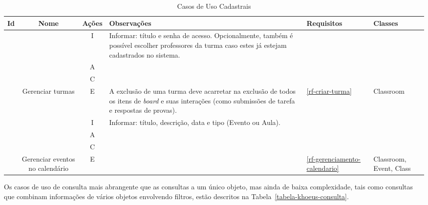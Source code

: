 \begin{table}[H]
	\centering  \vspace{0.5cm} 	\footnotesize 
	\caption{Casos de Uso Cadastrais}
	\begin{tabular}{|c|c|c|p{6cm}|p{1.5cm}|p{2cm}|} \hline  \rowcolor[rgb]{0.8,0.8,0.8}
		
		Id & Nome  &  Ações  &  Observações & Requisitos   & Classes  \\ 	\hline \hline	
		
		{}  &  {}  &  I   & Informar: título e senha de acesso. Opcionalmente, também é possível escolher professores da turma caso estes já estejam cadastrados no sistema. &   {}   & {}    \\\cline{3-4}
		{}  &  {}  &  A   &  {}   &   {}   &  {}  \\ \cline{3-4}
		{}  &  {}  &  C  &   {}   &   {}  &   {}    \\\cline{3-4}
		\multirow{-4}{*}{\UC\label{uc-gerenciar-turmas}}   &  \multirow{-4}{*}{\parbox{2cm}{Gerenciar turmas}}   &    E    &    A exclusão de uma turma deve acarretar na exclusão de todos os itens de \textit{board} e suas interações (como submissões de tarefa e respostas de provas).   &  \multirow{-4}{1.5cm}{\ref{rf-criar-turma}}  & \multirow{-4}{2cm}{Classroom}  \\ \hline 
		
		{}  &  {}  &  I   &  Informar: título, descrição, data e tipo (Evento ou Aula). &   {}   & {}    \\\cline{3-4}
		{}  &  {}  &  A   &  {}   &   {}   &  {}  \\ \cline{3-4}
		{}  &  {}  &  C  &   {}   &   {}  &   {}    \\\cline{3-4}
		\multirow{-5}{*}{\UC\label{uc-gerenciar-calendario}}   &  \multirow{-5}{*}{\parbox{2cm}{Gerenciar eventos no calendário}}   &    E    &   {}   &  \multirow{-5}{1.5cm}{\ref{rf-gerenciamento-calendario}}  & \multirow{-5}{2cm}{Classroom, Event, Class}  \\ \hline 
		
		
	\end{tabular}
	\label{tabela-classroom-cadastrais}
\end{table}

Os casos de uso de consulta mais abrangente que as consultas a um único objeto, mas ainda de baixa complexidade, tais como consultas que combinam informações de vários objetos envolvendo filtros, estão descritos na Tabela~\ref{tabela-khoeus-consulta}.

